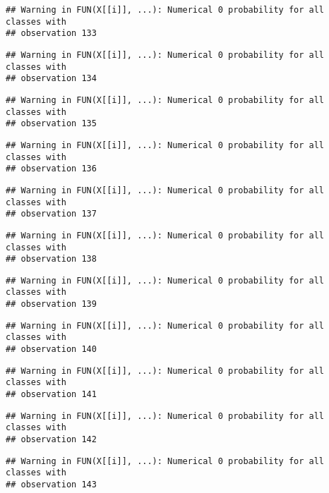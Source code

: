 \documentclass[
]{article}
\begin{document}
\begin{verbatim}
## Warning in FUN(X[[i]], ...): Numerical 0 probability for all classes with
## observation 133
\end{verbatim}

\begin{verbatim}
## Warning in FUN(X[[i]], ...): Numerical 0 probability for all classes with
## observation 134
\end{verbatim}

\begin{verbatim}
## Warning in FUN(X[[i]], ...): Numerical 0 probability for all classes with
## observation 135
\end{verbatim}

\begin{verbatim}
## Warning in FUN(X[[i]], ...): Numerical 0 probability for all classes with
## observation 136
\end{verbatim}

\begin{verbatim}
## Warning in FUN(X[[i]], ...): Numerical 0 probability for all classes with
## observation 137
\end{verbatim}

\begin{verbatim}
## Warning in FUN(X[[i]], ...): Numerical 0 probability for all classes with
## observation 138
\end{verbatim}

\begin{verbatim}
## Warning in FUN(X[[i]], ...): Numerical 0 probability for all classes with
## observation 139
\end{verbatim}

\begin{verbatim}
## Warning in FUN(X[[i]], ...): Numerical 0 probability for all classes with
## observation 140
\end{verbatim}

\begin{verbatim}
## Warning in FUN(X[[i]], ...): Numerical 0 probability for all classes with
## observation 141
\end{verbatim}

\begin{verbatim}
## Warning in FUN(X[[i]], ...): Numerical 0 probability for all classes with
## observation 142
\end{verbatim}

\begin{verbatim}
## Warning in FUN(X[[i]], ...): Numerical 0 probability for all classes with
## observation 143
\end{verbatim}
\end{document}
